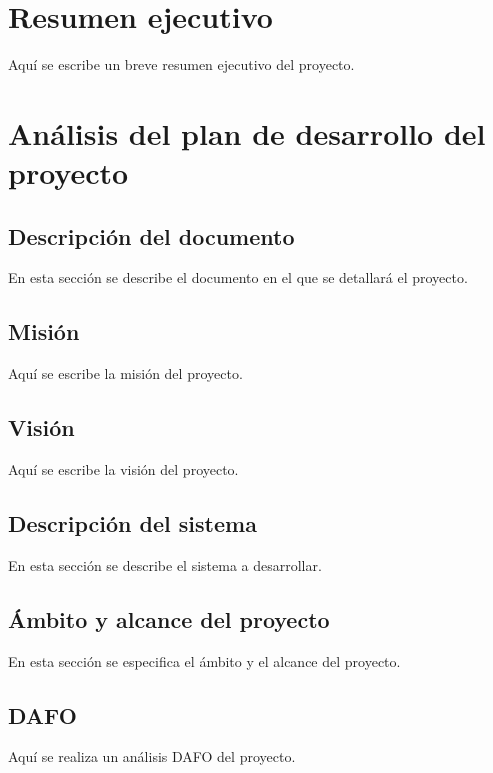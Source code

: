 \section{\textbf{Resumen ejecutivo}}

Aquí se escribe un breve resumen ejecutivo del proyecto.

\section{\textbf{Análisis del plan de desarrollo del proyecto}}

\subsection{\textbf{Descripción del documento}}

En esta sección se describe el documento en el que se detallará el proyecto.

\subsection{\textbf{Misión}}

Aquí se escribe la misión del proyecto.

\subsection{\textbf{Visión}}

Aquí se escribe la visión del proyecto.

\subsection{\textbf{Descripción del sistema}}

En esta sección se describe el sistema a desarrollar.

\subsection{\textbf{Ámbito y alcance del proyecto}}

En esta sección se especifica el ámbito y el alcance del proyecto.

\subsection{\textbf{DAFO}}

Aquí se realiza un análisis DAFO del proyecto.


